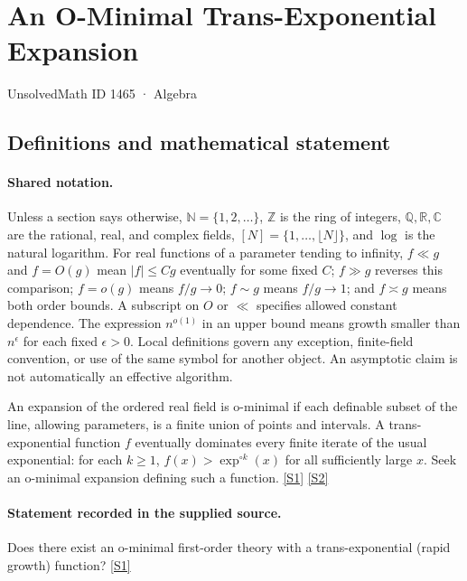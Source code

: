 \documentclass[11pt,a4paper]{article}
\newcommand{\N}{\mathbb{N}}
\newcommand{\Z}{\mathbb{Z}}
\newcommand{\Q}{\mathbb{Q}}
\newcommand{\R}{\mathbb{R}}
\newcommand{\C}{\mathbb{C}}
\newcommand{\sref}[2]{\hyperlink{source:#1:#2}{[S#2]}}
\begin{document}

\setcounter{section}{1464}

\section{An O-Minimal Trans-Exponential Expansion}\label{1465}

{\small\sffamily UnsolvedMath ID 1465 · Algebra}

\subsection{Definitions and mathematical statement}

\paragraph{Shared notation.}Unless a section says otherwise, $\N=\{1,2,\ldots\}$,
$\Z$ is the ring of integers, $\Q,\R,\C$ are the rational, real, and complex
fields, $[N]=\{1,\ldots,\lfloor N\rfloor\}$, and $\log$ is the natural
logarithm. For real functions of a parameter tending to infinity,
$f\ll g$ and $f=O(g)$ mean $|f|\leq Cg$ eventually for some fixed $C$;
$f\gg g$ reverses this comparison; $f=o(g)$ means $f/g\to0$;
$f\sim g$ means $f/g\to1$; and $f\asymp g$ means both order bounds.
A subscript on $O$ or $\ll$ specifies allowed constant dependence.
The expression $n^{o(1)}$ in an upper bound means growth smaller than
$n^\epsilon$ for each fixed $\epsilon>0$. Local definitions govern any
exception, finite-field convention, or use of the same symbol for another
object. An asymptotic claim is not automatically an effective algorithm.



An expansion of the ordered real field is o-minimal if each definable subset of the line, allowing parameters, is a finite union of points and intervals. A trans-exponential function $f$ eventually dominates every finite iterate of the usual exponential: for each $k\geq1$, $f(x)>\exp^{\circ k}(x)$ for all sufficiently large $x$. Seek an o-minimal expansion defining such a function. \sref{1465}{1} \sref{1465}{2}

\paragraph{Statement recorded in the supplied source.}
Does there exist an o-minimal first-order theory with a trans-exponential (rapid growth) function? \sref{1465}{1}
\end{document}
